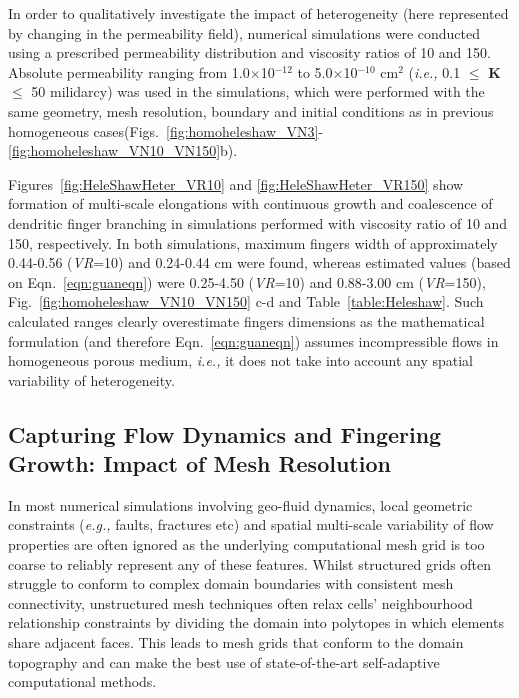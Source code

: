 \documentclass[preprint,authoryear,12pt]{elsarticle}
\newcommand{\eg}{{\it e.g., }}
\newcommand{\ie}{{\it i.e., }}
\begin{document}
In order to qualitatively investigate the impact of heterogeneity (here represented by changing in the permeability field), numerical simulations were conducted using a prescribed permeability distribution and viscosity ratios of 10 and 150. Absolute permeability ranging from 1.0$\times$10$^{-12}$ to 5.0$\times$10$^{-10}$ cm$^{2}$ (\ie 0.1 $\le$ {\bf K} $\le$ 50 milidarcy) was used in the simulations, which were performed with the same geometry,  mesh resolution, boundary and initial conditions as in previous homogeneous cases(Figs.~\ref{fig:homoheleshaw_VN3}-\ref{fig:homoheleshaw_VN10_VN150}b). 

Figures~\ref{fig:HeleShawHeter_VR10} and \ref{fig:HeleShawHeter_VR150} show formation of multi-scale elongations with continuous growth and coalescence of dendritic finger branching in simulations performed with viscosity ratio of 10 and 150, respectively. In both simulations, maximum fingers width of approximately 0.44-0.56 ({\it VR}=10) and 0.24-0.44 cm were found, whereas estimated values (based on Eqn.~\ref{eqn:guaneqn}) were 0.25-4.50 ({\it VR}=10) and 0.88-3.00 cm ({\it VR}=150), Fig.~\ref{fig:homoheleshaw_VN10_VN150} c-d and Table~\ref{table:Heleshaw}. Such calculated ranges \citep[\ie theoretical values based on analytic solutions due to][]{mclean_1981} clearly overestimate fingers dimensions as the mathematical formulation (and therefore Eqn.~\ref{eqn:guaneqn}) assumes incompressible flows in homogeneous porous medium, \ie it does not take into account any spatial variability of heterogeneity.       
     
\subsection{Capturing Flow Dynamics and Fingering Growth: Impact of Mesh Resolution}\label{section:results_hete_fix_adapt}    

In most numerical simulations involving geo-fluid dynamics, local geometric constraints (\eg faults, fractures etc) and spatial multi-scale variability of flow properties are often ignored as the underlying computational mesh grid is too coarse to reliably represent any of these features. Whilst structured grids often struggle to conform to complex domain boundaries with consistent mesh connectivity, unstructured mesh techniques often relax cells' neighbourhood relationship constraints by dividing the domain into polytopes in which elements share adjacent faces. This leads to mesh grids that conform to the domain topography and can make the best use of state-of-the-art self-adaptive computational methods.
\end{document}
